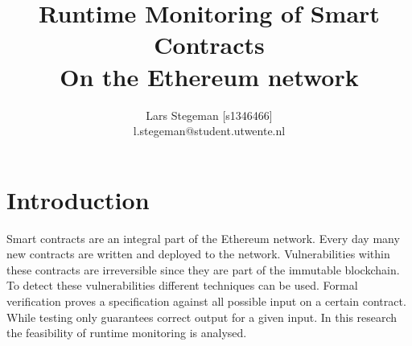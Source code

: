 \documentclass[a4paper]{article}
\title{Runtime Monitoring of Smart Contracts \\
\large On the Ethereum network \\}
\author{Lars Stegeman [s1346466]\\ l.stegeman@student.utwente.nl}
\begin{document}
\maketitle
\section{Introduction}
Smart contracts are an integral part of the Ethereum network. Every day many new contracts are written and deployed to the network. Vulnerabilities within these contracts are irreversible since they are part of the immutable blockchain. To detect these vulnerabilities different techniques can be used. Formal verification proves a specification against all possible input on a certain contract. While testing only guarantees correct output for a given input. In this research the feasibility of runtime monitoring is analysed.
\end{document}
